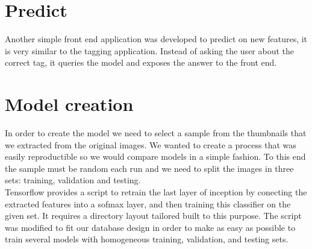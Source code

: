 \section{Predict}

Another simple front end application was developed to predict on new features, it is very similar to the tagging application. Instead of asking the user about the correct tag, it queries the model and exposes the answer to the front end.\\



\section{Model creation}

In order to create the model we need to select a sample from the thumbnails that we extracted from the original images. We wanted to create a process that was easily reproductible so we would compare models in a simple fashion. To this end the sample must be random each run and we need to split the images in three sets: training, validation and testing.\\

Tensorflow provides a script to retrain the last layer of inception by conecting the extracted features into a sofmax layer, and then training this classifier on the given set. It requires a directory layout tailored built to this purpose. The script was modified to fit our database design in order to make as easy as possible to train several models with homogeneous training, validation, and testing sets.


